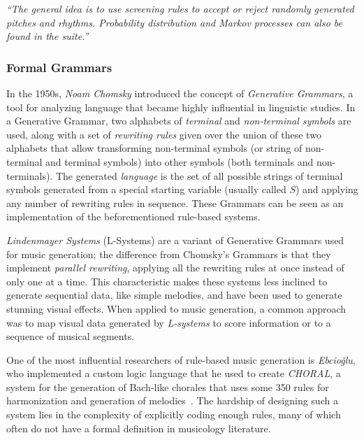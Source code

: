\textit{``The general idea is to use screening rules to accept or reject randomly generated pitches and rhythms.
Probability distribution and Markov processes can also be found in the suite.''}~\cite{illiac-suite}

\subsubsection{Formal Grammars}\label{subsubsec:formal-grammars}

In the 1950s, \textit{Noam Chomsky} introduced the concept of \textit{Generative Grammars}, a tool for analyzing language that became highly influential in linguistic studies.
In a Generative Grammar, two alphabets of \textit{terminal} and \textit{non-terminal symbols} are used, along with a set of \textit{rewriting rules} given over the union of these two alphabets that allow transforming non-terminal symbols (or string of non-terminal and terminal symbols) into other symbols (both terminals and non-terminals).
The generated \textit{language} is the set of all possible strings of terminal symbols generated from a special starting variable (usually called $S$) and applying any number of rewriting rules in sequence.
These Grammars can be seen as an implementation of the beforementioned rule-based systems.~\cite{computational-creativity}

\textit{Lindenmayer Systems} (L-Systems) are a variant of Generative Grammars used for music generation;
the difference from Chomsky's Grammars is that they implement \textit{parallel rewriting}, applying all the rewriting rules at once instead of only one at a time.
This characteristic makes these systems less inclined to generate sequential data, like simple melodies, and have been used to generate stunning visual effects.
When applied to music generation, a common approach was to map visual data generated by \textit{L-systems} to score information or to a sequence of musical segments.~\cite{computational-creativity}

One of the most influential researchers of rule-based music generation is \textit{Ebcioǧlu}, who implemented a custom logic language that he used to create \textsl{CHORAL}, a system for the generation of Bach-like chorales that uses some 350 rules for harmonization and generation of melodies~\cite{ebcioglu}.
The hardship of designing such a system lies in the complexity of explicitly coding enough rules, many of which often do not have a formal definition in musicology literature.~\cite{computational-creativity}

